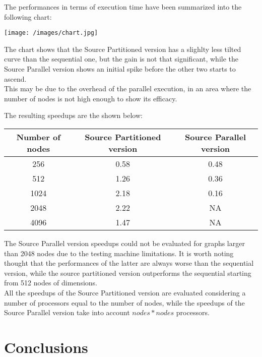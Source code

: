 \documentclass[
	a4paper, %
	12pt, %
]{class}
\begin{document}
The performances in terms of execution time have been summarized into the following chart:

\begin{center}
    \texttt{[image: /images/chart.jpg]}
\end{center}

The chart shows that the Source Partitioned version has a slighlty less tilted curve than the sequential one, but the gain is not
that significant, while the Source Parallel version shows an initial spike before the other two starts to ascend. \\

This may be due to the overhead of the parallel execution, in an area where the number of nodes is not high enough to show its efficacy.
\newpage

The resulting speedups are the shown below:

\begin{center}
    \begin{tabular}{ |c|c|c| }
    \hline
    \textbf{Number of nodes} & \textbf{Source Partitioned version} & \textbf{Source Parallel version} \\ \hline
    256 & 0.58  & 0.48 \\ \hline
    512 & 1.26 & 0.36 \\ \hline
    1024 & 2.18 & 0.16 \\ \hline
    2048 & 2.22 & NA \\ \hline
    4096 & 1.47 & NA \\ \hline
    \end{tabular}
\end{center}

The Source Parallel version speedups could not be evaluated for graphs larger than 2048 nodes due to the testing machine
limitations. It is worth noting thought that the performances of the latter are always worse than the sequential version, while the source
partitioned version outperforms the sequential starting from 512 nodes of dimensions. \\

All the speedups of the Source Partitioned version are evaluated considering a number of processors equal to the number of nodes, while the speedups
of the Source Parallel version take into account $nodes * nodes$ processors.

\section{Conclusions}
\end{document}
